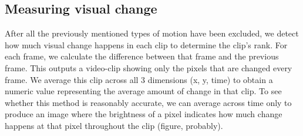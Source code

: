 \subsection{Measuring visual change}
After all the previously mentioned types of motion have been excluded, we detect how much visual change happens in each clip to determine the clip's rank. For each frame, we calculate the difference between that frame and the previous frame. This outputs a video-clip showing only the pixels that are changed every frame. We average this clip across all 3 dimensions (x, y, time) to obtain a numeric value representing the average amount of change in that clip. To see whether this method is reasonably accurate, we can average across time only to produce an image where the brightness of a pixel indicates how much change happens at that pixel throughout the clip (figure, probably).
